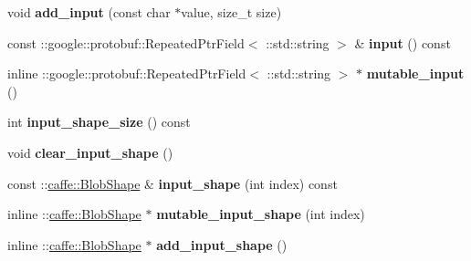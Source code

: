 \begin{DoxyCompactItemize}
\item 
\mbox{\label{classcaffe_1_1_net_parameter_a85f036f4b6acb756d9cf54232f58b92b}} 
void {\bfseries add\+\_\+input} (const char $\ast$value, size\+\_\+t size)
\item 
\mbox{\label{classcaffe_1_1_net_parameter_a5d4929693f2a2933e86886e3e342c143}} 
const \+::google\+::protobuf\+::\+Repeated\+Ptr\+Field$<$ \+::std\+::string $>$ \& {\bfseries input} () const
\item 
\mbox{\label{classcaffe_1_1_net_parameter_a20242be0c9dc852c340a013053560956}} 
inline \+::google\+::protobuf\+::\+Repeated\+Ptr\+Field$<$ \+::std\+::string $>$ $\ast$ {\bfseries mutable\+\_\+input} ()
\item 
\mbox{\label{classcaffe_1_1_net_parameter_a0017a2f783838981ab61a8873c35b7d5}} 
int {\bfseries input\+\_\+shape\+\_\+size} () const
\item 
\mbox{\label{classcaffe_1_1_net_parameter_a04707a09fbc2e851638eb99b6615f04e}} 
void {\bfseries clear\+\_\+input\+\_\+shape} ()
\item 
\mbox{\label{classcaffe_1_1_net_parameter_ab7cd00af76e54dd8ac1814defa242b7d}} 
const \+::\mbox{\hyperlink{classcaffe_1_1_blob_shape}{caffe\+::\+Blob\+Shape}} \& {\bfseries input\+\_\+shape} (int index) const
\item 
\mbox{\label{classcaffe_1_1_net_parameter_a20f60a46d0d1074d35c144e8f2cf056a}} 
inline \+::\mbox{\hyperlink{classcaffe_1_1_blob_shape}{caffe\+::\+Blob\+Shape}} $\ast$ {\bfseries mutable\+\_\+input\+\_\+shape} (int index)
\item 
\mbox{\label{classcaffe_1_1_net_parameter_a726bc93f890f05eea566fab6a6d6864e}} 
inline \+::\mbox{\hyperlink{classcaffe_1_1_blob_shape}{caffe\+::\+Blob\+Shape}} $\ast$ {\bfseries add\+\_\+input\+\_\+shape} ()
\item 
\mbox{\label{classcaffe_1_1_net_parameter_a3ad1f76c46a1851b2495e1ac3a91b00e}} 

\end{DoxyCompactItemize}
